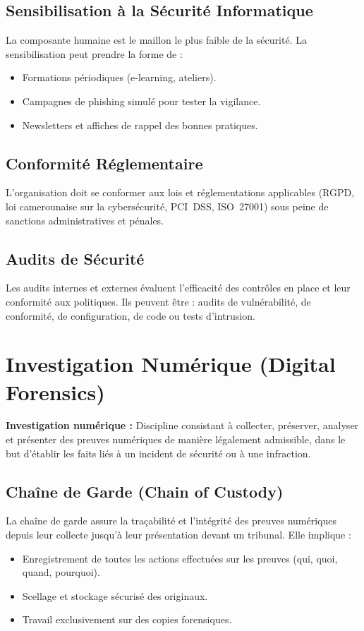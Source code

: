 \subsection{Sensibilisation à la Sécurité Informatique}
La composante humaine est le maillon le plus faible de la sécurité. La sensibilisation peut prendre la forme de :
\begin{itemize}
    \item Formations périodiques (e-learning, ateliers).
    \item Campagnes de phishing simulé pour tester la vigilance.
    \item Newsletters et affiches de rappel des bonnes pratiques.
\end{itemize}

\subsection{Conformité Réglementaire}
L'organisation doit se conformer aux lois et réglementations applicables (RGPD, loi camerounaise sur la cybersécurité, PCI~DSS, ISO~27001) sous peine de sanctions administratives et pénales.

\subsection{Audits de Sécurité}
Les audits internes et externes évaluent l'efficacité des contrôles en place et leur conformité aux politiques. Ils peuvent être : audits de vulnérabilité, de conformité, de configuration, de code ou tests d'intrusion.

\section{Investigation Numérique (Digital Forensics)}

\begin{boxdef}
\textbf{Investigation numérique :} Discipline consistant à collecter, préserver, analyser et présenter des preuves numériques de manière légalement admissible, dans le but d'établir les faits liés à un incident de sécurité ou à une infraction.
\end{boxdef}

\subsection{Chaîne de Garde (Chain of Custody)}
La chaîne de garde assure la traçabilité et l'intégrité des preuves numériques depuis leur collecte jusqu'à leur présentation devant un tribunal. Elle implique :
\begin{itemize}
    \item Enregistrement de toutes les actions effectuées sur les preuves (qui, quoi, quand, pourquoi).
    \item Scellage et stockage sécurisé des originaux.
    \item Travail exclusivement sur des copies forensiques.
\end{itemize}

